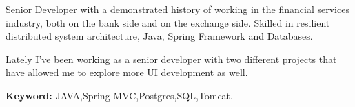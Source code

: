 \documentclass[9pt]{developercv} %
\begin{document}

\begin{minipage}[t]{0.45\textwidth} %
	\vspace{-\baselineskip} %
Senior Developer
 with a demonstrated history of working in the financial services
 industry, both on the bank side and on the exchange side. Skilled in 
resilient distributed system architecture, Java, Spring Framework and Databases.

Lately I've been working as a senior developer with two different projects that have allowed me to explore more UI development as well. 
	  
\textbf{Keyword:} JAVA,Spring MVC,Postgres,SQL,Tomcat.

\end{minipage}
\hfill %
\begin{minipage}[t]{0.47\textwidth} %
	\vspace{-\baselineskip} %
	\begin{barchart}{5.5}
	\end{barchart}
\end{minipage}
 

\end{document}
